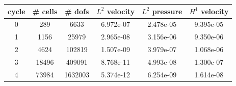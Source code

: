 \documentclass[10pt]{report}
\begin{document}
\begin{table}[H]
\begin{center}
\begin{tabular}{|c|c|c|c|c|c|} \hline
cycle & \# cells & \# dofs & $L^2$ velocity & $L^2$ pressure & $H^1$ velocity\\ \hline
0 & 289 & 6633 & 6.972e-07 & 2.478e-05 & 9.395e-05\\ \hline
1 & 1156 & 25979 & 2.965e-08 & 3.156e-06 & 9.350e-06\\ \hline
2 & 4624 & 102819 & 1.507e-09 & 3.979e-07 & 1.068e-06\\ \hline
3 & 18496 & 409091 & 8.768e-11 & 4.993e-08 & 1.300e-07\\ \hline
4 & 73984 & 1632003 & 5.374e-12 & 6.254e-09 & 1.614e-08\\ \hline
\end{tabular}
\end{center}
\end{table}
\end{document}
